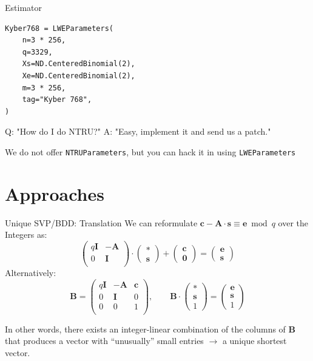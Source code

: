 \documentclass[table,10pt,aspectratio=169]{beamer}
\renewcommand{\vec}[1]{\ensuremath{\mathbf{#1}}\xspace}
\begin{document}
\begin{frame}[label={sec:org3d147cd},fragile]{Estimator}
 \lstset{language=Python,label= ,caption= ,captionpos=b,numbers=none}
\begin{lstlisting}
Kyber768 = LWEParameters(
    n=3 * 256,
    q=3329,
    Xs=ND.CenteredBinomial(2),
    Xe=ND.CenteredBinomial(2),
    m=3 * 256,
    tag="Kyber 768",
)
\end{lstlisting}

\begin{alertblock}{Q: "How do I do NTRU?"}
A: "Easy, implement it and send us a patch."

We do not offer \texttt{NTRUParameters}, but you can hack it in using \texttt{LWEParameters}
\end{alertblock}
\end{frame}

\section{Approaches}
\label{sec:orgae3b24b}
\begin{frame}[label={sec:orgf0c8d9f}]{Unique SVP/BDD: Translation}
We can reformulate \(\vec{c} - \mathbf{A} \cdot \vec{s} \equiv \vec{e} \bmod q\)  over the Integers as:
\[
  \begin{pmatrix}
    q\mathbf{I} & -\mathbf{A}\\
    0 & \mathbf{I}\\
  \end{pmatrix} \cdot
  \begin{pmatrix}
    \mathbf{*}\\
    \mathbf{s}
  \end{pmatrix} +
  \begin{pmatrix}
    \vec{c}\\
    \vec{0}
  \end{pmatrix} = 
  \begin{pmatrix}
    \vec{e}\\
    \vec{s}
  \end{pmatrix}
\]
Alternatively:
\[
  \mathbf{B} = \begin{pmatrix}
    q\mathbf{I} & -\mathbf{A} & \vec{c}\\
    0 & \mathbf{I} & 0\\
    0 & 0 & 1\\
  \end{pmatrix}, \qquad
  \mathbf{B} \cdot
  \begin{pmatrix}
    \vec{*}\\
    \vec{s}\\
    1
  \end{pmatrix} = 
  \begin{pmatrix}
    \vec{e}\\
    \vec{s}\\
    1
  \end{pmatrix}
\]

In other words, there exists an integer-linear combination of the columns of \(\mathbf{B}\) that produces a vector with “unusually” small entries \(\rightarrow\) a unique shortest vector.
\end{frame}
\end{document}
